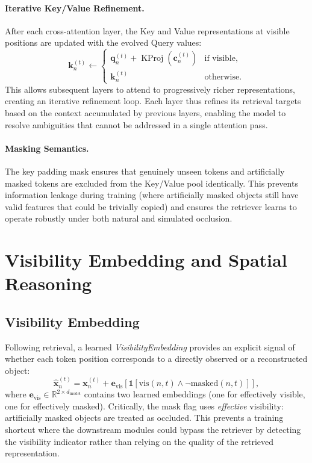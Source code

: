 \documentclass{article}
\newcommand{\mR}{\mathbb{R}}
\newcommand{\op}[1]{\operatorname{#1}}
\newcommand{\mat}[1]{\bm{#1}}
\begin{document}
\paragraph{Iterative Key/Value Refinement.}  After each cross-attention layer, the Key and Value representations at visible positions are updated with the evolved Query values:
\begin{equation}
    \mat{k}_n^{(t)} \leftarrow \begin{cases} \mat{q}_n^{(t)} + \op{KProj}(\mat{c}_n^{(t)}) & \text{if visible}, \\ \mat{k}_n^{(t)} & \text{otherwise}. \end{cases}
    \label{eq:kv_update}
\end{equation}
This allows subsequent layers to attend to progressively richer representations, creating an iterative refinement loop.  Each layer thus refines its retrieval targets based on the context accumulated by previous layers, enabling the model to resolve ambiguities that cannot be addressed in a single attention pass.

\paragraph{Masking Semantics.}  The key padding mask ensures that genuinely unseen tokens and artificially masked tokens are excluded from the Key/Value pool identically.  This prevents information leakage during training (where artificially masked objects still have valid features that could be trivially copied) and ensures the retriever learns to operate robustly under both natural and simulated occlusion.

\section{Visibility Embedding and Spatial Reasoning}
\label{sec:vis_iot}

\subsection{Visibility Embedding}

Following retrieval, a learned \emph{VisibilityEmbedding} provides an explicit signal of whether each token position corresponds to a directly observed or a reconstructed object:
\begin{equation}
    \hat{\mat{x}}_n^{(t)} = \mat{x}_n^{(t)} + \mat{e}_{\text{vis}}[\mathbb{1}[\text{vis}(n,t) \wedge \neg\text{masked}(n,t)]],
    \label{eq:vis_emb}
\end{equation}
where $\mat{e}_{\text{vis}} \in \mR^{2 \times d_{\text{model}}}$ contains two learned embeddings (one for effectively visible, one for effectively masked).  Critically, the mask flag uses \emph{effective} visibility: artificially masked objects are treated as occluded.  This prevents a training shortcut where the downstream modules could bypass the retriever by detecting the visibility indicator rather than relying on the quality of the retrieved representation.
\end{document}
